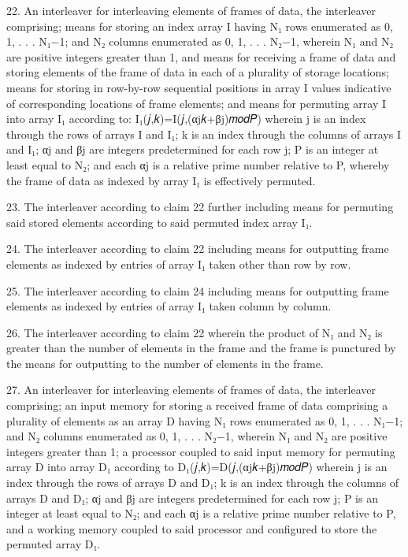 \documentclass[11pt,a4paper]{article}
\begin{document}
22. An interleaver for interleaving elements of frames of data, the interleaver comprising; means for storing an index array I having N₁ rows enumerated as 0, 1, . . . N₁−1; and N₂ columns enumerated as 0, 1, . . . N₂−1, wherein N₁ and N₂ are positive integers greater than 1, and means for receiving a frame of data and storing elements of the frame of data in each of a plurality of storage locations; means for storing in row-by-row sequential positions in array I values indicative of corresponding locations of frame elements; and means for permuting array I into array I₁ according to: I₁(𝑗,𝑘)=I(𝑗,(αj𝑘+βj)𝑚𝑜𝑑𝑃)  wherein j is an index through the rows of arrays I and I₁; k is an index through the columns of arrays I and I₁; αj and βj are integers predetermined for each row j; P is an integer at least equal to N₂; and each αj is a relative prime number relative to P, whereby the frame of data as indexed by array I₁ is effectively permuted.

23. The interleaver according to claim 22 further including means for permuting said stored elements according to said permuted index array I₁.

24. The interleaver according to claim 22 including means for outputting frame elements as indexed by entries of array I₁ taken other than row by row.

25. The interleaver according to claim 24 including means for outputting frame elements as indexed by entries of array I₁ taken column by column.

26. The interleaver according to claim 22 wherein the product of N₁ and N₂ is greater than the number of elements in the frame and the frame is punctured by the means for outputting to the number of elements in the frame.

27. An interleaver for interleaving elements of frames of data, the interleaver comprising; an input memory for storing a received frame of data comprising a plurality of elements as an array D having N₁ rows enumerated as 0, 1, . . . N₁−1; and N₂ columns enumerated as 0, 1, . . . N₂−1, wherein N₁ and N₂ are positive integers greater than 1; a processor coupled to said input memory for permuting array D into array D₁ according to D₁(𝑗,𝑘)=D(𝑗,(αj𝑘+βj)𝑚𝑜𝑑𝑃)  wherein j is an index through the rows of arrays D and D₁; k is an index through the columns of arrays D and D₁; αj and βj are integers predetermined for each row j; P is an integer at least equal to N₂; and each αj is a relative prime number relative to P, and a working memory coupled to said processor and configured to store the permuted array D₁.
\end{document}
